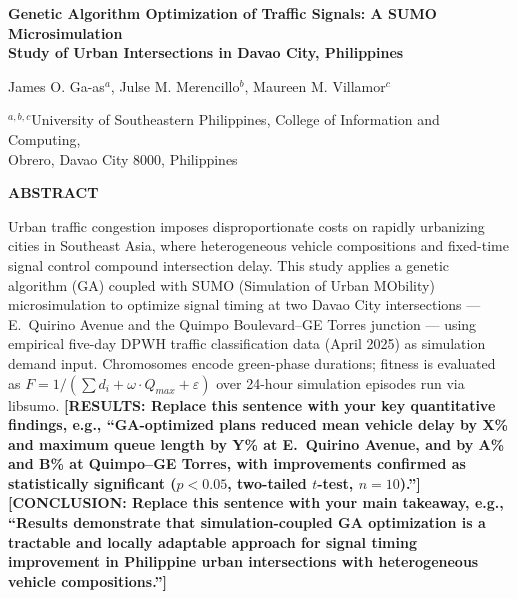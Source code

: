 \documentclass[a4paper,10pt]{article}
\begin{document}
	
	\begin{center}
		
		{\fontsize{16}{19}\selectfont\bfseries
			Genetic Algorithm Optimization of Traffic Signals: A SUMO Microsimulation\\
			Study of Urban Intersections in Davao City, Philippines
			\par}
		
		\vspace{10pt}
		
		{\fontsize{12}{14}\selectfont
			James O. Ga-as$^{a}$, Julse M. Merencillo$^{b}$, Maureen M. Villamor$^{c}$
			\par}
		
		\vspace{4pt}
		
		{\normalsize
			$^{a,b,c}$University of Southeastern Philippines, College of Information and Computing,\\
			Obrero, Davao City 8000, Philippines
			\par}
		
	\end{center}
	
	\vspace{8pt}
	
	\begin{center}
		{\fontsize{11}{13}\selectfont\bfseries ABSTRACT\par}
	\end{center}
	
	\noindent
	Urban traffic congestion imposes disproportionate costs on rapidly urbanizing cities in Southeast Asia, where heterogeneous vehicle compositions and fixed-time signal control compound intersection delay. This study applies a genetic algorithm (GA) coupled with SUMO (Simulation of Urban MObility) microsimulation to optimize signal timing at two Davao City intersections --- E.~Quirino Avenue and the Quimpo Boulevard--GE Torres junction --- using empirical five-day DPWH traffic classification data (April 2025) as simulation demand input. Chromosomes encode green-phase durations; fitness is evaluated as $F = 1/(\sum d_i + \omega \cdot Q_{max} + \varepsilon)$ over 24-hour simulation episodes run via libsumo. \textbf{[RESULTS: Replace this sentence with your key quantitative findings, e.g., ``GA-optimized plans reduced mean vehicle delay by X\% and maximum queue length by Y\% at E.~Quirino Avenue, and by A\% and B\% at Quimpo--GE Torres, with improvements confirmed as statistically significant ($p < 0.05$, two-tailed $t$-test, $n = 10$).'']}\@ \textbf{[CONCLUSION: Replace this sentence with your main takeaway, e.g., ``Results demonstrate that simulation-coupled GA optimization is a tractable and locally adaptable approach for signal timing improvement in Philippine urban intersections with heterogeneous vehicle compositions.'']}
	
\end{document}
